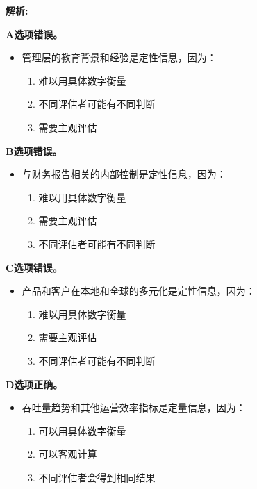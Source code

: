\documentclass{article}
\newenvironment{explanation}
{\textbf{解析:}\par}
{\par}
\begin{document}
\begin{explanation}
    \textbf{A选项错误。}
    \begin{itemize}
        \item 管理层的教育背景和经验是定性信息，因为：
        \begin{enumerate}
            \item 难以用具体数字衡量
            \item 不同评估者可能有不同判断
            \item 需要主观评估
        \end{enumerate}
    \end{itemize}
    
    \textbf{B选项错误。}
    \begin{itemize}
        \item 与财务报告相关的内部控制是定性信息，因为：
        \begin{enumerate}
            \item 难以用具体数字衡量
            \item 需要主观评估
            \item 不同评估者可能有不同判断
        \end{enumerate}
    \end{itemize}
    
    \textbf{C选项错误。}
    \begin{itemize}
        \item 产品和客户在本地和全球的多元化是定性信息，因为：
        \begin{enumerate}
            \item 难以用具体数字衡量
            \item 需要主观评估
            \item 不同评估者可能有不同判断
        \end{enumerate}
    \end{itemize}
    
    \textbf{D选项正确。}
    \begin{itemize}
        \item 吞吐量趋势和其他运营效率指标是定量信息，因为：
        \begin{enumerate}
            \item 可以用具体数字衡量
            \item 可以客观计算
            \item 不同评估者会得到相同结果
        \end{enumerate}
    \end{itemize}
\end{explanation}
\end{document}

